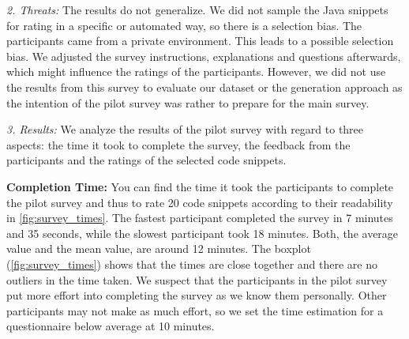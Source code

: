 \documentclass[%
class=scrreprt,
chapterprefix=false,%
open=right,%
twoside=false,%
paper=a4,%
logofile={Logo\_zentral\_farbig\_EN.png},%
thesistype=master,%
UKenglish,%
]{se2thesis}
\theoremstyle{definition}
\begin{document}
	\textit{2. Threats:}
	The results do not generalize. We did not sample the Java snippets for rating in a specific or automated way, so there is a selection bias. The participants came from a private environment. This leads to a possible selection bias.
	We adjusted the survey instructions, explanations and questions afterwards, which might influence the ratings of the participants.
	However, we did not use the results from this survey to evaluate our dataset or the generation approach as the intention of the pilot survey was rather to prepare for the main survey. 
	
	\textit{3. Results:}
	We analyze the results of the pilot survey with regard to three aspects: the time it took to complete the survey, the feedback from the participants and the ratings of the selected code snippets.
	
	\textbf{Completion Time:} 
	You can find the time it took the participants to complete the pilot survey and thus to rate 20 code snippets according to their readability in \autoref{fig:survey_times}.
	The fastest participant completed the survey in 7 minutes and 35 seconds, while the slowest participant took 18 minutes. 
	Both, the average value and the mean value, are around 12 minutes. The boxplot (\autoref{fig:survey_times}) shows that the times are close together and there are no outliers in the time taken.
	We suspect that the participants in the pilot survey put more effort into completing the survey as we know them personally. 
	Other participants may not make as much effort, so we set the time estimation for a questionnaire below average at 10 minutes.
		
\end{document}
